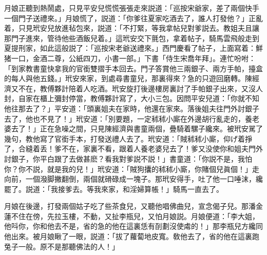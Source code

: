 月娘正聽到熱鬧處，只見平安兒慌慌張張走來説道：「巡按宋爺家，差了兩個快手一個門子送禮來。」月娘慌了，説道：「你爹往夏家吃酒去了，誰人打發他？」正亂着，只見玳安兒放進毡包來，説道：「不打緊，等我拿帖兒對爹説去。教姐夫且讓那門子進來，管待他些酒飯兒着。」這玳安交下氈包，拿着帖子，騎馬雲飛般走到夏提刑家，如此這般説了：「巡按宋老爺送禮來。」西門慶看了帖子，上面寫着：鮮猪一口，金酒二尊，公紙四刀，小書一部。」下書「侍生宋喬年拜」。連忙吩咐：「到家教書童快拿我的官銜雙摺手本回去。門子答賞他三兩銀子、兩方手帕，擡盒的每人與他五錢。」玳安來家，到處尋書童兒，那裏得來？急的只遊回磨轉。陳經濟又不在，教傅夥計陪着人吃酒。玳安旋打後邊樓房裏討了手帕銀子出來，又沒人封，自家在櫃上彌封停當，教傅夥計寫了，大小三包。因問平安兒道：「你就不知他往那去了？」平安道：「頭裏姐夫在家時，他還在家來。落後姐夫往門外討銀子去了，他也不見了！」玳安道：「別要題，一定秫秫小廝在外邊胡行亂走的，養老婆去了！」正在急噪之間，只見陳經濟與書童兩個，疊騎着騾子纔來。被玳安駡了幾句，教他寫了官銜手本，打發送禮人去了。玳安道：「賊秫秫小廝，仰げ着掙了，合縫着丢！爹不在，家裏不看，跟着人養老婆兒去了！爹又没使你和姐夫門外討銀子，你平白跟了去做甚麽？看我對爹説不説！」書童道：「你説不是，我怕你？你不説，就是我的兒！」玳安道：「賊狗攮的秫秫小廝，你賭個兒眞個！」走向前，一個潑脚撇翻倒，兩個就磆碌成一塊子。那玳安得手，吐了他一口唾沫，纔罷了。説道：「我接爹去。等我來家，和淫婦算帳！」騎馬一直去了。

月娘在後邊，打發兩個姑子吃了些茶食兒，又聽他唱佛曲兒，宣念偈子兒。那潘金蓮不住在傍，先拉玉樓，不動，又扯李瓶兒，又怕月娘説。月娘便道：「李大姐，他呌你，你和他去不是，省的急的他在這裏恁有㓦劃沒使䖏的！」那李瓶兒方纔同他出來。被月娘瞅了一眼，説道：「拔了蘿蔔地皮寬。敎他去了，省的他在這裏跑兔子一般。原不是那聽佛法的人！」

